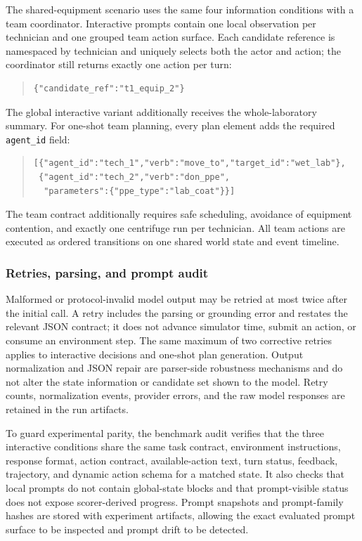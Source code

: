 The shared-equipment scenario uses the same four information conditions with a
team coordinator. Interactive prompts contain one local observation per
technician and one grouped team action surface. Each candidate reference is
namespaced by technician and uniquely selects both the actor and action; the
coordinator still returns exactly one action per turn:
\begin{quote}
\begin{verbatim}
{"candidate_ref":"t1_equip_2"}
\end{verbatim}
\end{quote}
The global interactive variant additionally receives the whole-laboratory
summary. For one-shot team planning, every plan element adds the required
\texttt{agent\_id} field:
\begin{quote}
\begin{verbatim}
[{"agent_id":"tech_1","verb":"move_to","target_id":"wet_lab"},
 {"agent_id":"tech_2","verb":"don_ppe",
  "parameters":{"ppe_type":"lab_coat"}}]
\end{verbatim}
\end{quote}
The team contract additionally requires safe scheduling, avoidance of equipment
contention, and exactly one centrifuge run per technician. All team actions are
executed as ordered transitions on one shared world state and event timeline.

\subsubsection{Retries, parsing, and prompt audit}

Malformed or protocol-invalid model output may be retried at most twice after
the initial call. A retry includes the parsing or grounding error and restates
the relevant JSON contract; it does not advance simulator time, submit an
action, or consume an environment step. The same maximum of two corrective
retries applies to interactive decisions and one-shot plan generation. Output
normalization and JSON repair are parser-side robustness mechanisms and do not
alter the state information or candidate set shown to the model. Retry counts,
normalization events, provider errors, and the raw model responses are retained
in the run artifacts.

To guard experimental parity, the benchmark audit verifies that the three
interactive conditions share the same task contract, environment instructions,
response format, action contract, available-action text, turn status, feedback,
trajectory, and dynamic action schema for a matched state. It also checks that
local prompts do not contain global-state blocks and that prompt-visible status
does not expose scorer-derived progress. Prompt snapshots and prompt-family
hashes are stored with experiment artifacts, allowing the exact evaluated
prompt surface to be inspected and prompt drift to be detected.
